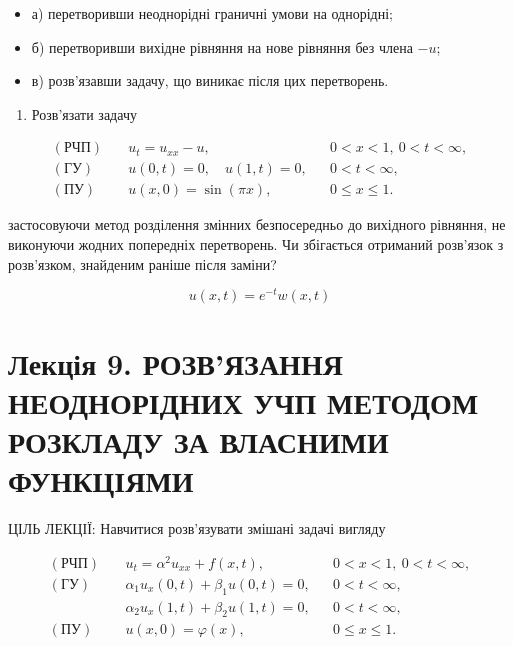 \begin{itemize}
\tightlist
\item
  а) перетворивши неоднорідні граничні умови на однорідні;
\item
  б) перетворивши вихідне рівняння на нове рівняння без члена \(-u\);
\item
  в) розв'язавши задачу, що виникає після цих перетворень.
\end{itemize}

\begin{enumerate}
\def\labelenumi{\arabic{enumi}.}
\setcounter{enumi}{2}
\tightlist
\item
  Розв'язати задачу
\end{enumerate}

\[
\begin{aligned}
(\text{РЧП})\quad & u_t = u_{xx} - u, && 0 < x < 1,\ 0 < t < \infty, \\
(\text{ГУ})\quad & u(0,t) = 0,\quad u(1,t) = 0, && 0 < t < \infty, \\
(\text{ПУ})\quad & u(x,0) = \sin(\pi x), && 0 \leqslant x \leqslant 1.
\end{aligned}
\]

застосовуючи метод розділення змінних безпосередньо до вихідного рівняння, не виконуючи жодних попередніх перетворень. Чи збігається отриманий розв'язок з розв'язком, знайденим раніше після заміни?

\[
u(x,t) = e^{-t}w(x,t)
\]

\section{Лекція 9. РОЗВ'ЯЗАННЯ НЕОДНОРІДНИХ УЧП МЕТОДОМ РОЗКЛАДУ ЗА ВЛАСНИМИ ФУНКЦІЯМИ}\label{ux43bux435ux43aux446ux456ux44f-9.-ux440ux43eux437ux432ux44fux437ux430ux43dux43dux44f-ux43dux435ux43eux434ux43dux43eux440ux456ux434ux43dux438ux445-ux443ux447ux43f-ux43cux435ux442ux43eux434ux43eux43c-ux440ux43eux437ux43aux43bux430ux434ux443-ux437ux430-ux432ux43bux430ux441ux43dux438ux43cux438-ux444ux443ux43dux43aux446ux456ux44fux43cux438}

ЦІЛЬ ЛЕКЦІЇ: Навчитися розв'язувати змішані задачі вигляду

\[
\begin{aligned}
(\text{РЧП})\quad & u_t = \alpha^2 u_{xx} + f(x,t), && 0 < x < 1,\ 0 < t < \infty, \\
(\text{ГУ})\quad & \alpha_1 u_x(0,t) + \beta_1 u(0,t) = 0, && 0 < t < \infty, \\
& \alpha_2 u_x(1,t) + \beta_2 u(1,t) = 0, && 0 < t < \infty, \\
(\text{ПУ})\quad & u(x,0) = \varphi(x), && 0 \leqslant x \leqslant 1.
\end{aligned}
\]

